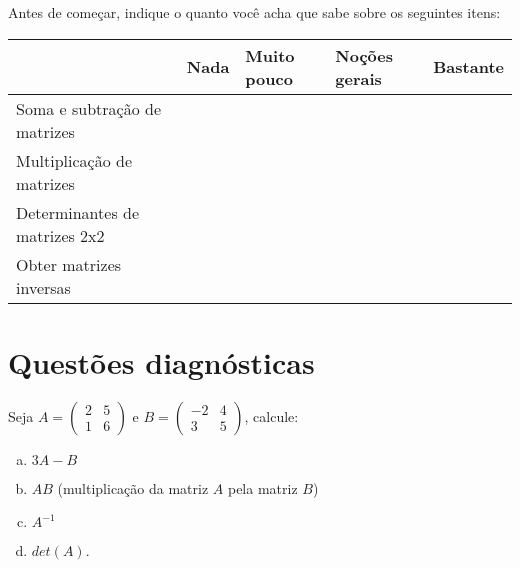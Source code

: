 \documentclass[main_estudante.tex]{subfiles}
\begin{document}
Antes de começar, indique o quanto você acha que sabe sobre os seguintes itens:

\begin{center}
 \begin{tabular}{|p{35mm}||p{15mm}|p{15mm}|p{15mm}|p{15mm}|} 
 \hline
   & Nada & Muito pouco & Noções gerais & Bastante\\
 \hline
 Soma e subtração de matrizes &  &  &  &  \\ 
 \hline
 Multiplicação de matrizes &  &  &  &  \\
 \hline
 Determinantes de matrizes 2x2 &  &  &  &  \\
 \hline
 Obter matrizes inversas &  &  &  &  \\
 \hline
\end{tabular}
\end{center}

\paraAmbos

\section{Questões diagnósticas}

\begin{diagnostico}
Seja $A=\begin{pmatrix}2 & 5 \\ 1 & 6\end{pmatrix}$ e $B=\begin{pmatrix}-2 & 4 \\ 3 & 5\end{pmatrix}$, calcule:
\begin{enumerate}[a)]
  \item $3A-B$
  
  \item $AB$ (multiplicação da matriz $A$ pela matriz $B$)

  \item $A^{-1}$
  
  \item $det(A)$.
\end{enumerate}
\end{diagnostico}
\end{document}
